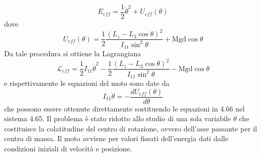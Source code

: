 \begin{equation}
	E_{eff} = \frac{1}{2} \dot{\theta}^2 + U_{eff}(\theta)
\end{equation}
dove 
\begin{equation}
	U_{eff}(\theta) = \frac{1}{2}\frac{ \left ( L_{z} - L_{3}\cos \theta \right )^2}{I_{11} \sin^2 \theta } + \text{Mgd}\cos\theta
\end{equation}
Da tale procedura si ottiene la Lagrangiana 
\begin{equation}
	\boxed{\mathcal{L}_{eff} = \frac{1}{2}I_{11} \dot{\theta}^2 - \frac{1}{2}\frac{ \left ( L_{z} - L_{3}\cos \theta \right )^2}{I_{11} \sin^2 \theta } - \text{Mgd}\cos\theta} 
\end{equation}
e rispettivamente le equazioni del moto sono date da 
\begin{equation}
	I_{11}\ddot{\theta} = - \frac{d U_{eff}(\theta)}{d\theta}
\end{equation}
che possono essere ottenute direttamente sostituendo le equazioni in 4.66 nel sistema 4.65. \newline
Il problema \`{e} stato ridotto allo studio di una sola variabile $\theta$ che costituisce la colatitudine del centro di rotazione, ovvero dell'asse passante per il centro di massa. Il moto avviene per valori fissati dell'energia dati dalle condizioni iniziali di velocit\`{a} e posizione.

